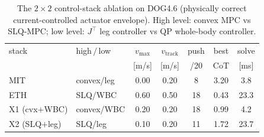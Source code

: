 \begin{table}[t]\centering
\caption{The $2\times2$ control-stack ablation on DOG4.6 (physically correct
current-controlled actuator envelope). High level: convex MPC vs SLQ-MPC;
low level: $J^\top$ leg controller vs QP whole-body controller.}
\label{tab:ablation_4p6}
\begin{tabular}{llccccc}
\toprule
stack & high$\,/\,$low & $v_\mathrm{max}$ & $v_\mathrm{track}$ & push & best & solve \\
 & & [m/s] & [m/s] & /20 & CoT & [ms] \\
\midrule
MIT & convex/leg & 0.00 & 0.20 & 8 & 3.20 & 3.8 \\
ETH & SLQ/WBC & 0.60 & 0.50 & 18 & 0.43 & 23.3 \\
X1 (cvx$+$WBC) & convex/WBC & 0.20 & 0.20 & 18 & 0.99 & 4.2 \\
X2 (SLQ$+$leg) & SLQ/leg & 0.10 & 0.20 & 11 & 1.72 & 23.7 \\
\bottomrule
\end{tabular}
\end{table}
